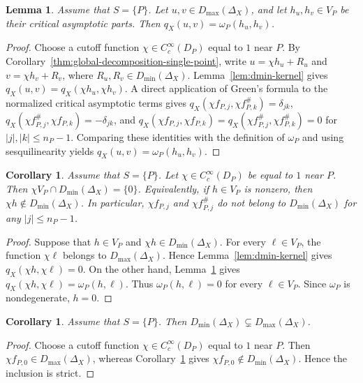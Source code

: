 \documentclass[12pt]{amsart}
\theoremstyle{plain}
\newtheorem{lem}[thm]{Lemma}
\newtheorem{cor}[thm]{Corollary}
\theoremstyle{definition}
\theoremstyle{remark}
\numberwithin{equation}{section} \numberwithin{figure}{section}
\begin{document}
\begin{lem}\label{lem:green-form-local}
Assume that \(S=\{P\}\). Let
\(u,v\in D_{\max}(\Delta_X)\), and let \(h_u,h_v\in V_P\) be their
critical asymptotic parts. Then
\(q_X(u,v)=\omega_P(h_u,h_v)\).
\end{lem}

\begin{proof}
Choose a cutoff function \(\chi\in C_c^\infty(D_P)\) equal to \(1\)
near \(P\). By
Corollary~\ref{thm:global-decomposition-single-point}, write
\(u=\chi h_u+R_u\) and \(v=\chi h_v+R_v\), where
\(R_u,R_v\in D_{\min}(\Delta_X)\). Lemma~\ref{lem:dmin-kernel} gives
\(q_X(u,v)=q_X(\chi h_u,\chi h_v)\).
A direct application of Green's formula to the normalized critical
asymptotic terms gives
\(q_X(\chi f_{P,j},\chi f_{P,k}^{\#})=\delta_{jk}\),
\(q_X(\chi f_{P,j}^{\#},\chi f_{P,k})=-\delta_{jk}\), and
\(q_X(\chi f_{P,j},\chi f_{P,k})
=q_X(\chi f_{P,j}^{\#},\chi f_{P,k}^{\#})=0\) for
\(|j|,|k|\leq n_P-1\). Comparing these identities with the definition
of \(\omega_P\) and using sesquilinearity yields
\(q_X(u,v)=\omega_P(h_u,h_v)\).
\end{proof}

\begin{cor}\label{cor:critical-terms-not-minimal}
Assume that \(S=\{P\}\). Let
\(\chi\in C_c^\infty(D_P)\) be equal to \(1\) near \(P\). Then
\(\chi V_P\cap D_{\min}(\Delta_X)=\{0\}\). Equivalently, if
\(h\in V_P\) is nonzero, then
\(\chi h\notin D_{\min}(\Delta_X)\). In particular,
\(\chi f_{P,j}\) and \(\chi f_{P,j}^{\#}\) do not belong to
\(D_{\min}(\Delta_X)\) for any \(|j|\leq n_P-1\).
\end{cor}

\begin{proof}
Suppose that \(h\in V_P\) and
\(\chi h\in D_{\min}(\Delta_X)\). For every \(\ell\in V_P\), the
function \(\chi\ell\) belongs to \(D_{\max}(\Delta_X)\). Hence
Lemma~\ref{lem:dmin-kernel} gives
\(q_X(\chi h,\chi\ell)=0\). On the other hand,
Lemma~\ref{lem:green-form-local} gives
\(q_X(\chi h,\chi\ell)=\omega_P(h,\ell)\). Thus
\(\omega_P(h,\ell)=0\) for every \(\ell\in V_P\). Since \(\omega_P\)
is nondegenerate, \(h=0\).
\end{proof}

\begin{cor}\label{cor:dmin-proper}
Assume that \(S=\{P\}\). Then
\(D_{\min}(\Delta_X)\subsetneq D_{\max}(\Delta_X)\).
\end{cor}

\begin{proof}
Choose a cutoff function \(\chi\in C_c^\infty(D_P)\) equal to \(1\)
near \(P\). Then \(\chi f_{P,0}\in D_{\max}(\Delta_X)\), whereas
Corollary~\ref{cor:critical-terms-not-minimal} gives
\(\chi f_{P,0}\notin D_{\min}(\Delta_X)\). Hence the inclusion is
strict.
\end{proof}
\end{document}
